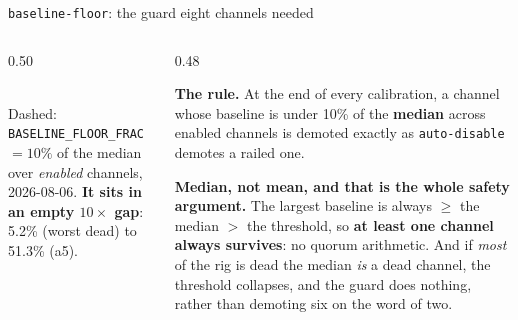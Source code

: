 \documentclass[aspectratio=169]{beamer}
\begin{document}
\begin{frame}{\texttt{baseline-floor}: the guard eight channels needed}
  \begin{columns}[T]
    \begin{column}{0.50\textwidth}
      \centering
      \\
      {\scriptsize Dashed: \texttt{BASELINE\_FLOOR\_FRAC} $= 10\%$ of the median
       over \emph{enabled} channels, 2026-08-06. \textbf{It sits in an empty
       $10\times$ gap}: 5.2\% (worst dead) to 51.3\% (a5).}
    \end{column}
    \begin{column}{0.48\textwidth}
      \scriptsize\raggedright
      \textbf{The rule.} At the end of every calibration, a channel whose
      baseline is under 10\% of the \textbf{median} across enabled channels is
      demoted exactly as \texttt{auto-disable} demotes a railed one.

      \vspace{1.5mm}
      \textbf{Median, not mean, and that is the whole safety argument.} The
      largest baseline is always $\geq$ the median $>$ the threshold, so
      \textbf{at least one channel always survives}: no quorum arithmetic. And
      if \emph{most} of the rig is dead the median \emph{is} a dead channel, the
      threshold collapses, and the guard does nothing, rather than demoting six
      on the word of two.


\end{column}
\end{columns}
\end{frame}
\end{document}

